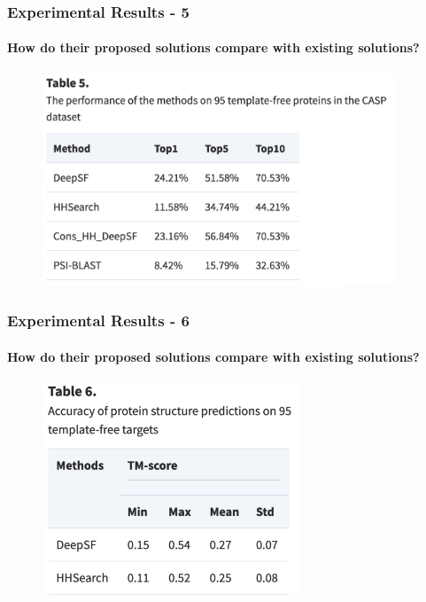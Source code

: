 \documentclass[xcolor={usenames,dvipsnames},hyperref={hyperindex,bookmarks}]{beamer}
\begin{document}
\frame
{
	\frametitle{Experimental Results - 5}
	\framesubtitle{How do their proposed solutions compare with existing solutions?}


	\begin{figure}[h]
	\centering 
	\includegraphics[height=2.5in]{./pics/table-5}
	\label{fig:Table5}
	\end{figure}
}





\frame
{
	\frametitle{Experimental Results - 6}
	\framesubtitle{How do their proposed solutions compare with existing solutions?}


	\begin{figure}[h]
	\centering 
	\includegraphics[height=2.5in]{./pics/table-6}
	\label{fig:Table6}
	\end{figure}
}
\end{document}
